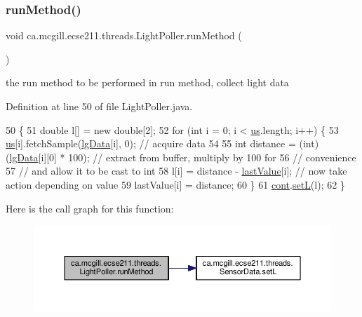 \subsubsection{\texorpdfstring{run\+Method()}{runMethod()}}
{\footnotesize\ttfamily void ca.\+mcgill.\+ecse211.\+threads.\+Light\+Poller.\+run\+Method (\begin{DoxyParamCaption}{ }\end{DoxyParamCaption})\hspace{0.3cm}{\ttfamily [protected]}}

the run method to be performed in run method, collect light data 

Definition at line 50 of file Light\+Poller.\+java.


\begin{DoxyCode}
50                              \{
51     \textcolor{keywordtype}{double} l[] = \textcolor{keyword}{new} \textcolor{keywordtype}{double}[2];
52     \textcolor{keywordflow}{for} (\textcolor{keywordtype}{int} i = 0; i < \hyperlink{classca_1_1mcgill_1_1ecse211_1_1threads_1_1_light_poller_ab6a9cb770bbf71f586697633db1475ff}{us}.length; i++) \{
53       \hyperlink{classca_1_1mcgill_1_1ecse211_1_1threads_1_1_light_poller_ab6a9cb770bbf71f586697633db1475ff}{us}[i].fetchSample(\hyperlink{classca_1_1mcgill_1_1ecse211_1_1threads_1_1_light_poller_a6cf53aecc3efc481f71d36341d2276c6}{lgData}[i], 0); \textcolor{comment}{// acquire data}
54 
55       \textcolor{keywordtype}{int} distance = (int) (\hyperlink{classca_1_1mcgill_1_1ecse211_1_1threads_1_1_light_poller_a6cf53aecc3efc481f71d36341d2276c6}{lgData}[i][0] * 100); \textcolor{comment}{// extract from buffer, multiply by 100 for}
56                                                  \textcolor{comment}{// convenience}
57       \textcolor{comment}{// and allow it to be cast to int}
58       l[i] = distance - \hyperlink{classca_1_1mcgill_1_1ecse211_1_1threads_1_1_light_poller_a79908bf56395ae82ab5ac57b5b40f206}{lastValue}[i]; \textcolor{comment}{// now take action depending on value}
59       lastValue[i] = distance;
60     \}
61     \hyperlink{classca_1_1mcgill_1_1ecse211_1_1threads_1_1_light_poller_ab6a9050ced4f6940add4735c8872194a}{cont}.\hyperlink{classca_1_1mcgill_1_1ecse211_1_1threads_1_1_sensor_data_af905a6f2825716ae1a39bf7f6be09477}{setL}(l);
62   \}
\end{DoxyCode}
Here is the call graph for this function\+:\nopagebreak
\begin{figure}[H]
\begin{center}
\leavevmode
\includegraphics[width=350pt]{classca_1_1mcgill_1_1ecse211_1_1threads_1_1_light_poller_aab90a460a4d0c926fb8f3930492a8fb1_cgraph}
\end{center}
\end{figure}


